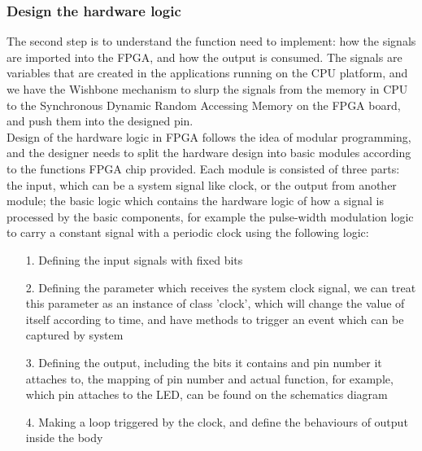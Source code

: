\documentclass[11pt,openright,a4paper]{report}
\begin{document}
\subsubsection{Design the hardware logic}
The second step is to understand the function need to implement: how the signals are imported into the FPGA, and how the output is consumed. The signals are variables that are created in the applications running on the CPU platform, and we have the Wishbone mechanism to slurp the signals from the memory in CPU to the Synchronous Dynamic Random Accessing Memory on the FPGA board, and push them into the designed pin. \\
Design of the hardware logic in FPGA follows the idea of modular programming, and the designer needs to split the hardware design into basic modules according to the functions FPGA chip provided. Each module is consisted of three parts: the input, which can be a system signal like clock, or the output from another module; the basic logic which contains the hardware logic of how a signal is processed by the basic components, for example the pulse-width modulation logic to carry a constant signal with a periodic clock using the following logic:
\begin{itemize}
	\item[1.] Defining the input signals with fixed bits
	\item[2.] Defining the parameter which receives the system clock signal, we can treat this parameter as an instance of class 'clock', which will change the value of itself according to time, and have methods to trigger an event which can be captured by system
	\item[3.] Defining the output, including the bits it contains and pin number it attaches to, the mapping of pin number and actual function, for example, which pin attaches to the LED, can be found on the schematics diagram
	\item[4.] Making a loop triggered by the clock, and define the behaviours of output inside the body
\end{itemize}	
\end{document}

